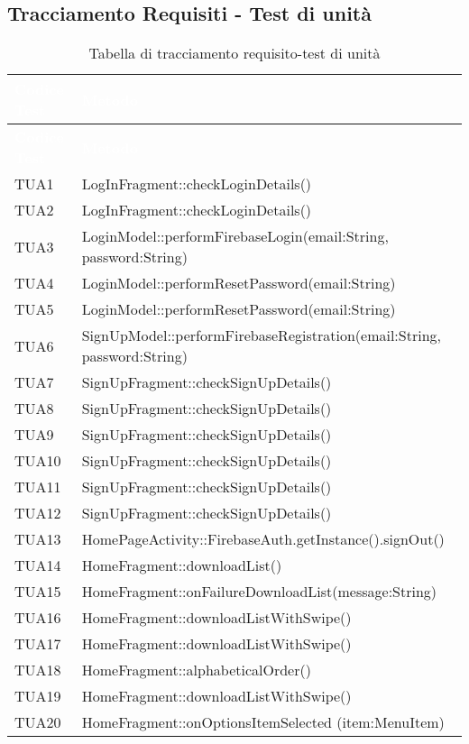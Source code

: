 \subsection{Tracciamento Requisiti - Test di unità}
{
	\renewcommand{\arraystretch}{1.5}
	\centering
	\begin{longtable}{C{2cm} C{12cm}}
		\caption{Tabella di tracciamento requisito-test di unità}\\
		\textcolor{white}{\textbf{Codice Test}} & \textcolor{white}{\textbf{Metodo}}\\	
		\endfirsthead
		\textcolor{white}{\textbf{Codice Test}} & \textcolor{white}{\textbf{Metodo}}\\	
		\endhead
		TUA1 & LogInFragment::checkLoginDetails()\\
		TUA2 & LogInFragment::checkLoginDetails()\\
		TUA3 & LoginModel::performFirebaseLogin(email:String, password:String)\\
		TUA4 & LoginModel::performResetPassword(email:String)\\
		TUA5 & LoginModel::performResetPassword(email:String)\\
		TUA6 & SignUpModel::performFirebaseRegistration(email:String, password:String)\\
		TUA7 & SignUpFragment::checkSignUpDetails()\\
		TUA8 & SignUpFragment::checkSignUpDetails()\\
		TUA9 & SignUpFragment::checkSignUpDetails()\\
		TUA10 & SignUpFragment::checkSignUpDetails()\\
		TUA11 & SignUpFragment::checkSignUpDetails()\\
		TUA12 & SignUpFragment::checkSignUpDetails()\\
		TUA13 & HomePageActivity::FirebaseAuth.getInstance().signOut()\\
		TUA14 & HomeFragment::downloadList()\\
		TUA15 & HomeFragment::onFailureDownloadList(message:String)\\
		TUA16 & HomeFragment::downloadListWithSwipe()\\
		TUA17 & HomeFragment::downloadListWithSwipe()\\
		TUA18 & HomeFragment::alphabeticalOrder()\\
		TUA19 & HomeFragment::downloadListWithSwipe()\\
		TUA20 & HomeFragment::onOptionsItemSelected (item:MenuItem)\\

\end{longtable}}
